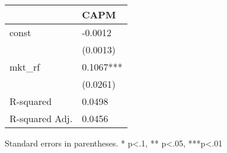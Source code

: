 \begin{table}
\caption{}
\label{}
\begin{center}
\begin{tabular}{ll}
\hline
               & CAPM       \\
\hline
const          & -0.0012    \\
               & (0.0013)   \\
mkt\_rf        & 0.1067***  \\
               & (0.0261)   \\
R-squared      & 0.0498     \\
R-squared Adj. & 0.0456     \\
\hline
\end{tabular}
\end{center}
\end{table}
\bigskip
Standard errors in parentheses. \newline 
* p<.1, ** p<.05, ***p<.01